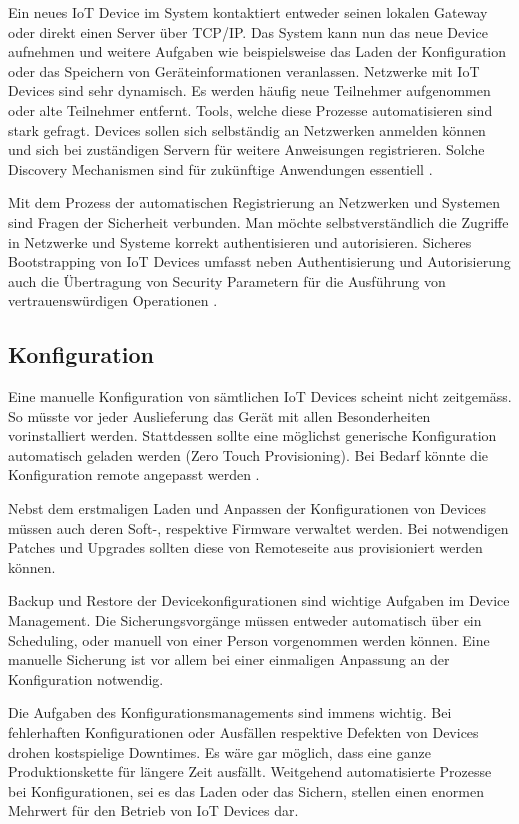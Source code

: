 Ein neues IoT Device im System kontaktiert entweder seinen lokalen Gateway oder direkt einen Server über TCP/IP. Das System kann nun das neue Device aufnehmen und weitere Aufgaben wie beispielsweise das Laden der Konfiguration oder das Speichern von Geräteinformationen veranlassen. Netzwerke mit IoT Devices sind sehr dynamisch. Es werden häufig neue Teilnehmer aufgenommen oder alte Teilnehmer entfernt. Tools, welche diese Prozesse automatisieren sind stark gefragt. Devices sollen sich selbständig an Netzwerken anmelden können und sich bei zuständigen Servern für weitere Anweisungen registrieren. Solche Discovery Mechanismen sind für zukünftige Anwendungen essentiell \cite{IoTDiscovery10}.

Mit dem Prozess der automatischen Registrierung an Netzwerken und Systemen sind Fragen der Sicherheit verbunden. Man möchte selbstverständlich die Zugriffe in Netzwerke und Systeme korrekt authentisieren und autorisieren. Sicheres Bootstrapping von IoT Devices umfasst neben Authentisierung und Autorisierung auch die Übertragung von Security Parametern für die Ausführung von vertrauenswürdigen Operationen \cite{IoTSecurityChallenges}.
\subsection{Konfiguration}
Eine manuelle Konfiguration von sämtlichen IoT Devices scheint nicht zeitgemäss. So müsste vor jeder Auslieferung das Gerät mit allen Besonderheiten vorinstalliert werden. Stattdessen sollte eine möglichst generische Konfiguration automatisch geladen werden (Zero Touch Provisioning). Bei Bedarf könnte die Konfiguration remote angepasst werden \cite{Weber16}.

Nebst dem erstmaligen Laden und Anpassen der Konfigurationen von Devices müssen auch deren Soft-, respektive Firmware verwaltet werden. Bei notwendigen Patches und Upgrades sollten diese von Remoteseite aus provisioniert werden können.

Backup und Restore der Devicekonfigurationen sind wichtige Aufgaben im Device Management. Die Sicherungsvorgänge müssen entweder automatisch über ein Scheduling, oder manuell von einer Person vorgenommen werden können. Eine manuelle Sicherung ist vor allem bei einer einmaligen Anpassung an der Konfiguration notwendig. 

Die Aufgaben des Konfigurationsmanagements sind immens wichtig. Bei fehlerhaften Konfigurationen oder Ausfällen respektive Defekten von Devices drohen kostspielige Downtimes. Es wäre gar möglich, dass eine ganze Produktionskette für längere Zeit ausfällt. Weitgehend automatisierte Prozesse bei Konfigurationen, sei es das Laden oder das Sichern, stellen einen enormen Mehrwert für den Betrieb von IoT Devices dar.

